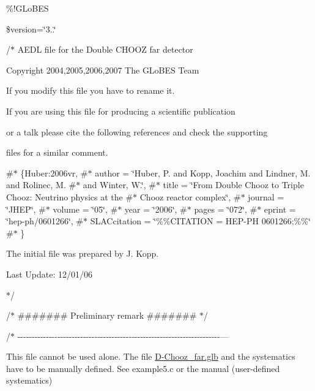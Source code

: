 \%!\+G\+Lo\+B\+ES

\$version=\char`\"{}3..\char`\"{}

/$\ast$ A\+E\+DL file for the Double C\+H\+O\+OZ far detector
\begin{DoxyItemize}
\item 
\item Copyright 2004,2005,2006,2007 The G\+Lo\+B\+ES Team
\item 
\item If you modify this file you have to rename it.
\item 
\item If you are using this file for producing a scientific publication
\item or a talk please cite the following references and check the supporting
\item files for a similar comment.
\item \#$\ast$ \{Huber\+:2006vr, \#$\ast$ author = \char`\"{}\+Huber, P. and Kopp, Joachim and Lindner, M. and Rolinec, M.
 \#$\ast$                 and Winter, W.\char`\"{}, \#$\ast$ title = \char`\"{}\+From Double Chooz to Triple Chooz\+: Neutrino physics at the
 \#$\ast$                 Chooz  reactor complex\char`\"{}, \#$\ast$ journal = \char`\"{}\+J\+H\+E\+P\char`\"{}, \#$\ast$ volume = \char`\"{}05\char`\"{}, \#$\ast$ year = \char`\"{}2006\char`\"{}, \#$\ast$ pages = \char`\"{}072\char`\"{}, \#$\ast$ eprint = \char`\"{}hep-\/ph/0601266\char`\"{}, \#$\ast$ S\+L\+A\+Ccitation = \char`\"{}\%\%\+C\+I\+T\+A\+T\+I\+O\+N = H\+E\+P-\/\+P\+H 0601266;\%\%\char`\"{} \#$\ast$ \}
\item 
\item The initial file was prepared by J. Kopp.
\item 
\item Last Update\+: 12/01/06
\item $\ast$/
\end{DoxyItemize}

/$\ast$ \#\#\#\#\#\#\# Preliminary remark \#\#\#\#\#\#\# $\ast$/

/$\ast$ -\/-\/-\/-\/-\/-\/-\/-\/-\/-\/-\/-\/-\/-\/-\/-\/-\/-\/-\/-\/-\/-\/-\/-\/-\/-\/-\/-\/-\/-\/-\/-\/-\/-\/-\/-\/-\/-\/-\/-\/-\/-\/-\/-\/-\/-\/-\/-\/-\/-\/-\/-\/-\/-\/-\/-\/-\/-\/-\/-\/-\/-\/-\/-\/-\/-\/-\/-\/-\/-\/-\/---

This file cannot be used alone. The file \hyperlink{D-Chooz__far_8glb}{D-\/\+Chooz\+\_\+far.\+glb} and the systematics have to be manually defined. See example5.\+c or the manual (user-\/defined systematics) 



